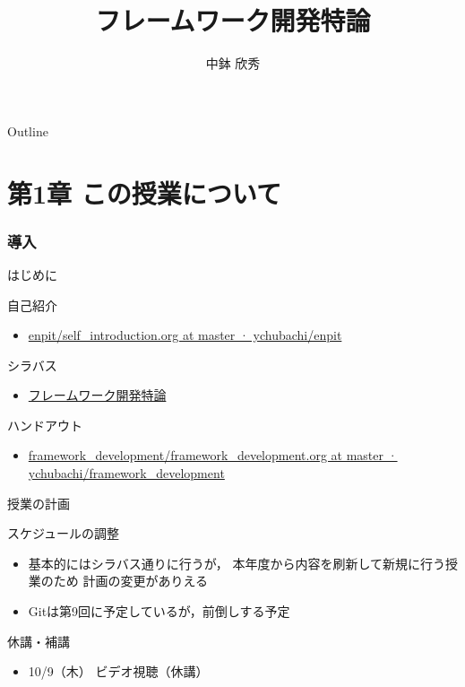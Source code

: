\documentclass[t, aspectratio=169]{beamer}
\date{\insertpart}
\institute[AIIT]{産業技術大学院大学(AIIT)}
\author{中鉢 欣秀}
\date{}
\title{フレームワーク開発特論}
\begin{document}
\maketitle
\begin{frame}{Outline}
\tableofcontents
\end{frame}


\part{第1章 この授業について}
\label{sec-1}
\section{導入}
\label{sec-1-1}
\begin{frame}[label=sec-1-1-1]{はじめに}
\begin{block}{自己紹介}
\begin{itemize}
\item \href{https://github.com/ychubachi/enpit/blob/master/slides/self_introduction.org}{enpit/self\_introduction.org at master · ychubachi/enpit}
\end{itemize}
\end{block}

\begin{block}{シラバス}
\begin{itemize}
\item \href{http://aiit.ac.jp/master_program/isa/lecture/pdf/h26/4_6.pdf}{フレームワーク開発特論}
\end{itemize}
\end{block}

\begin{block}{ハンドアウト}
\begin{itemize}
\item \href{https://github.com/ychubachi/framework_development/blob/master/slides/framework_development.org}{framework\_development/framework\_development.org at master · ychubachi/framework\_development}
\end{itemize}
\end{block}
\end{frame}

\begin{frame}[label=sec-1-1-2]{授業の計画}
\begin{block}{スケジュールの調整}
\begin{itemize}
\item 基本的にはシラバス通りに行うが，
本年度から内容を刷新して新規に行う授業のため
計画の変更がありえる
\item Gitは第9回に予定しているが，前倒しする予定
\end{itemize}
\end{block}

\begin{block}{休講・補講}
\begin{itemize}
\item 10/9（木） ビデオ視聴（休講）
\end{itemize}
\end{block}
\end{frame}
\end{document}
